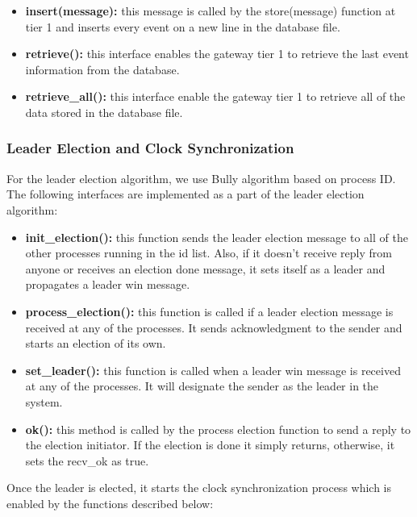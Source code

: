 \documentclass[12pt]{article}
\begin{document}
\begin{itemize}
	\item \textbf{insert(message):} this message is called by the store(message) function at 
	tier 1 and inserts every event on a new line in the database file. 
	
	\item \textbf{retrieve():} this interface enables the gateway tier 1 to retrieve the last 
	event information from the database. 
	
	\item \textbf{retrieve\_all():} this interface enable the gateway tier 1 to retrieve all of the 
	data stored in the database file. 
\end{itemize}

\subsubsection{Leader Election and Clock Synchronization}
For the leader election algorithm, we use Bully algorithm based on process
ID. The following interfaces are implemented as a part of the leader election 
algorithm: 

\begin{itemize}
	\item \textbf{init\_election():} this function sends the leader election message to 
	all of the other processes running in the id list. Also, if it doesn't receive reply from 
	anyone or receives an election done message, it sets itself as a leader and propagates
	a leader win message.
	
	\item \textbf{process\_election():} this function is called if a leader election message is 
	received at any of the processes. It sends acknowledgment to the sender and starts an 
	election of its own. 
	
	\item \textbf{set\_leader():} this function is called when a leader win message is received
	at any of the processes. It will designate the sender as the leader in the system.
	
	\item \textbf{ok():} this method is called by the process election function to send a reply 
	to the election initiator. If the election is done it simply returns, otherwise, it sets the recv\_ok as true. 
\end{itemize}

Once the leader is elected, it starts the clock synchronization process which is enabled by the functions described below: 
\end{document}

